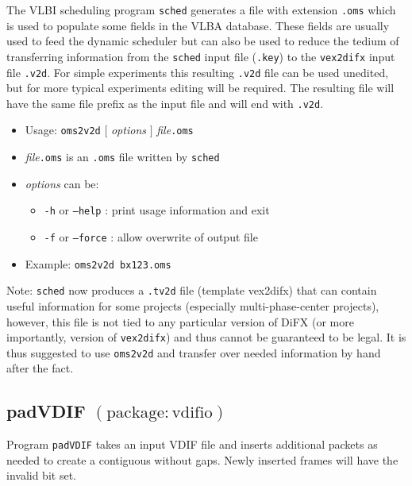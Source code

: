 The VLBI scheduling program {\tt sched} generates a file with extension {\tt .oms} which is used to populate some fields in the VLBA database.
These fields are usually used to feed the dynamic scheduler but can also be used to reduce the tedium of transferring information from the {\tt sched} input file ({\tt .key}) to the {\tt vex2difx} input file {\tt .v2d}.
For simple experiments this resulting {\tt .v2d} file can be used unedited, but for more typical experiments editing will be required.
The resulting file will have the same file prefix as the input file and will end with {\tt .v2d}.

\begin{itemize}
\item[] Usage: {\tt oms2v2d} $[$ {\em options} $]$ {\em file}{\tt .oms}

\item[] {\em file}{\tt .oms} is an {\tt .oms} file written by {\tt sched}
\item[] {\em options} can be:
\begin{itemize}
\item[] {\tt -h} or {\tt --help} : print usage information and exit
\item[] {\tt -f} or {\tt --force} : allow overwrite of output file
\end{itemize}
\item[] Example: {\tt oms2v2d bx123.oms}
\end{itemize}

\noindent
Note: {\tt sched} now produces a {\tt .tv2d} file (template vex2difx) that can contain useful information for some projects (especially multi-phase-center projects), however, this file is not tied to any particular version of DiFX (or more importantly, version of {\tt vex2difx}) and thus cannot be guaranteed to be legal.
It is thus suggested to use {\tt oms2v2d} and transfer over needed information by hand after the fact.








\subsection{padVDIF {\small $\mathrm{(package: vdifio)}$} \label{sec:padVDIF}}

Program {\tt padVDIF} takes an input VDIF file and inserts additional packets as needed to create a contiguous without gaps.
Newly inserted frames will have the invalid bit set.

